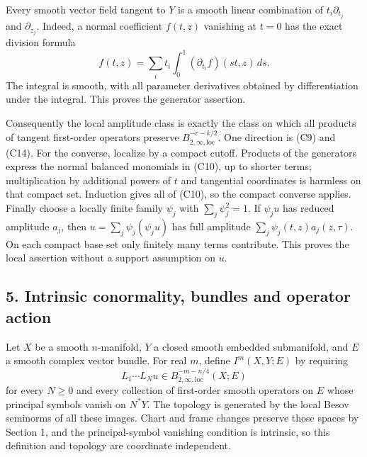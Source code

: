 \documentclass[
  11pt,
]{article}
\makeatletter
\let\ReaderOriginalAnchorStart\hyper@anchorstart
\let\ReaderOriginalAnchorEnd\hyper@anchorend
\let\ReaderPendingAliases\@empty
\def\ReaderArmAliases#1{\gdef\ReaderPendingAliases{#1}}
\def\hyper@anchorstart#1{\ReaderIfNativeAnchorTF{#1}{\ReaderPendingAliases\global\let\ReaderPendingAliases\@empty}{}\ReaderOriginalAnchorStart{#1}}
\makeatother
\begin{document}
Every smooth vector field tangent to \(Y\) is a smooth linear
combination of \(t_i\partial_{t_j}\) and \(\partial_{z_j}\). Indeed, a
normal coefficient \(f(t,z)\) vanishing at \(t=0\) has the exact
division formula \[
f(t,z)=\sum_i t_i\int_0^1(\partial_{t_i}f)(st,z)\,ds.
\tag{C14}
\] The integral is smooth, with all parameter derivatives obtained by
differentiation under the integral. This proves the generator assertion.

Consequently the local amplitude class is exactly the class on which all
products of tangent first-order operators preserve
\(B^{-r-k/2}_{2,\infty,\mathrm{loc}}\). One direction is (C9) and (C14).
For the converse, localize by a compact cutoff. Products of the
generators express the normal balanced monomials in (C10), up to shorter
terms; multiplication by additional powers of \(t\) and tangential
coordinates is harmless on that compact set. Induction gives all of
(C10), so the compact converse applies. Finally choose a locally finite
family \(\psi_j\) with \(\sum_j\psi_j^2=1\). If \(\psi_j u\) has reduced
amplitude \(a_j\), then \(u=\sum_j\psi_j(\psi_j u)\) has full amplitude
\(\sum_j\psi_j(t,z)a_j(z,\tau)\). On each compact base set only finitely
many terms contribute. This proves the local assertion without a support
assumption on \(u\).

\ReaderArmAliases{\ReaderOriginalAnchorStart{AN03-CN-005}\ReaderOriginalAnchorEnd\begingroup\expandafter\def\csname @currentHref\endcsname{AN03-CN-005}\label{AN03-CN-005}\endgroup\ReaderOriginalAnchorStart{an03-cn-005-intrinsic-conormality-bundles-and-operator-action}\ReaderOriginalAnchorEnd\begingroup\expandafter\def\csname @currentHref\endcsname{an03-cn-005-intrinsic-conormality-bundles-and-operator-action}\label{an03-cn-005-intrinsic-conormality-bundles-and-operator-action}\endgroup\ReaderOriginalAnchorStart{5-intrinsic-conormality-bundles-and-operator-action}\ReaderOriginalAnchorEnd\begingroup\expandafter\def\csname @currentHref\endcsname{5-intrinsic-conormality-bundles-and-operator-action}\label{5-intrinsic-conormality-bundles-and-operator-action}\endgroup\ReaderOriginalAnchorStart{intrinsic-conormality-bundles-and-operator-action}\ReaderOriginalAnchorEnd}
\subsection{5. Intrinsic conormality, bundles and operator
action}\label{intrinsic-conormality-bundles-and-operator-action}

Let \(X\) be a smooth \(n\)-manifold, \(Y\) a closed smooth embedded
submanifold, and \(E\) a smooth complex vector bundle. For real \(m\),
define \(I^m(X,Y;E)\) by requiring \[
L_1\cdots L_Nu\in B^{-m-n/4}_{2,\infty,\mathrm{loc}}(X;E)
\tag{C15}
\] for every \(N\geq0\) and every collection of first-order smooth
operators on \(E\) whose principal symbols vanish on \(N^*Y\). The
topology is generated by the local Besov seminorms of all these images.
Chart and frame changes preserve those spaces by Section 1, and the
principal-symbol vanishing condition is intrinsic, so this definition
and topology are coordinate independent.
\end{document}
